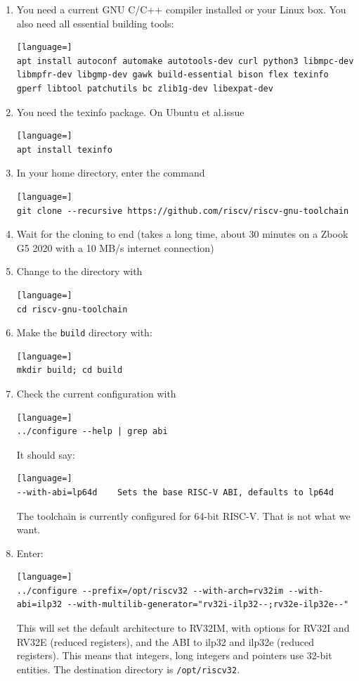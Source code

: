\documentclass[12pt]{article}
\begin{document}
\begin{enumerate}
\item You need a current GNU C/C++ compiler installed or your Linux box. You also need all essential building tools:
\begin{lstlisting}[language=]
apt install autoconf automake autotools-dev curl python3 libmpc-dev libmpfr-dev libgmp-dev gawk build-essential bison flex texinfo gperf libtool patchutils bc zlib1g-dev libexpat-dev
\end{lstlisting}
\item You need the texinfo package. On Ubuntu et al.\@ issue
\begin{lstlisting}[language=]
apt install texinfo
\end{lstlisting}
\item In your home directory, enter the command
\begin{lstlisting}[language=]
git clone --recursive https://github.com/riscv/riscv-gnu-toolchain
\end{lstlisting}
\item Wait for the cloning to end (takes a long time, about 30 minutes on a Zbook G5 2020 with a 10 MB/s internet connection)
\item Change to the directory with
\begin{lstlisting}[language=]
cd riscv-gnu-toolchain
\end{lstlisting}
\item Make the \texttt{build} directory with:
\begin{lstlisting}[language=]
mkdir build; cd build
\end{lstlisting}
\item Check the current configuration with
\begin{lstlisting}[language=]
../configure --help | grep abi
\end{lstlisting}
      It should say:
\begin{lstlisting}[language=]
--with-abi=lp64d    Sets the base RISC-V ABI, defaults to lp64d
\end{lstlisting}
The toolchain is currently configured for 64-bit RISC-V. That is not what we want.
\item Enter:
\begin{lstlisting}[language=]
../configure --prefix=/opt/riscv32 --with-arch=rv32im --with-abi=ilp32 --with-multilib-generator="rv32i-ilp32--;rv32e-ilp32e--"
\end{lstlisting}
This will set the default architecture to RV32IM, with options for RV32I and RV32E (reduced registers), and the ABI to ilp32 and ilp32e (reduced registers). This means that integers, long integers and pointers use 32-bit entities. The destination directory is \lstinline|/opt/riscv32|.


\end{enumerate}
\end{document}
